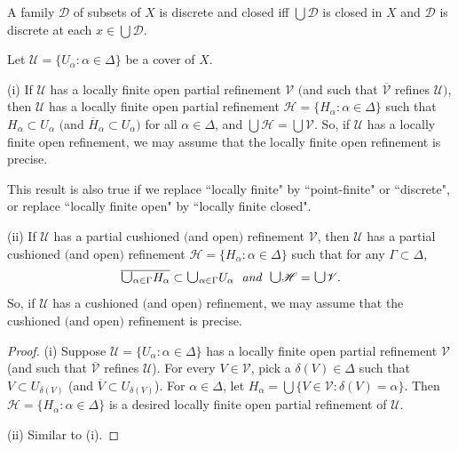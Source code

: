 \documentclass[main.tex]{subfiles}
\begin{document}
{\lemma{} \label{lem:1.1.4}
	A family $\mathscr{D}$ of subsets of $X$ is discrete and closed iff $\bigcup \mathscr{D}$ is closed in $X$ and $\mathscr{D}$ is discrete at each $x \in \bigcup \mathscr{D}$. 
	\hfill \qedsymbol
} %

{\lemma{} \label{lem:1.1.5}
	Let $\mathscr{U} = \{U_\alpha: \alpha \in \Delta\}$ be a cover of $X$. 
	
\textup{(i)} If $\mathscr{U}$ has a locally finite open partial refinement $\mathscr{V}$ 
	$($and such that $\overline{\mathscr{V}}$ refines $\mathscr{U})$, 
	then $\mathscr{U}$ has a locally finite 
	open partial refinement $\mathscr{H} = \{H_\alpha: \alpha \in \Delta\}$ such that
	$H_\alpha \subset U_\alpha$ $($and $\overline{H}_\alpha \subset U_\alpha)$ 
	for all $\alpha \in \Delta$, and 
	$\bigcup \mathscr{H} = \bigcup \mathscr{V}$.  
So, if $\mathscr{U}$ has a locally finite open refinement, we may assume that the  locally finite open
 refinement is precise.

	This result is also true if we replace ``locally finite" by  ``point-finite" or ``discrete",
	or replace ``locally finite open" by ``locally finite closed".
	
\textup{(ii)} If $\mathscr{U}$ has a partial cushioned $($and open$)$ refinement $\mathscr{V}$, 
then $\mathscr{U}$ has a partial cushioned $($and open$)$  refinement 
$\mathscr{H} = \{H_\alpha: \alpha \in \Delta\}$ such that for any 
$\Gamma \subset \Delta$, 
$$\overline{\raisebox{-1pt}{\scalebox{1.5}{$\cup$}}_{\alpha \in \Gamma} H_\alpha} \subset \raisebox{-1pt}{\scalebox{1.5}{$\cup$}}_{\alpha \in \Gamma} U_\alpha
\; \textit{ and } \;\raisebox{-1pt}{\scalebox{1.5}{$\cup$}}\mathscr{H} = 
 \raisebox{-1pt}{\scalebox{1.5}{$\cup$}} \mathscr{V}.$$  
So, if $\mathscr{U}$ has a  cushioned $($and open$)$ refinement, we may assume that the 
cushioned $($and open$)$ refinement is precise.
} %

\begin{proof} (i) Suppose $\mathscr{U} = \{U_\alpha: \alpha \in \Delta\}$ has a locally finite open partial refinement $\mathscr{V}$  (and such that 
	$\overline{\mathscr{V}}$ refines $\mathscr{U}$). For every $V\in\mathscr{V}$, pick 
	a $\delta(V)\in\Delta$ such that $V\subset U_{\delta(V)}$
	(and $\overline{V}\subset U_{\delta(V)}$). 
	For $\alpha \in \Delta$, let
	$H_\alpha = \bigcup\{V\in\mathscr{V}: \delta(V) = \alpha\}$.   
	Then $\mathscr{H} = \{H_\alpha: \alpha \in \Delta\}$ is a desired 
	locally finite open partial refinement of $\mathscr{U}$.
	
	(ii) Similar to (i).
\end{proof} 
\end{document}
